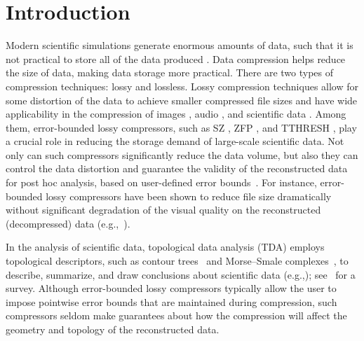 \section{Introduction}
\label{sec:introduction}

Modern scientific simulations generate enormous amounts of data, such that it is not practical to store all of the data produced \cite{cappello2019use}.
Data compression helps reduce the size of data, making data storage more practical.
There are two types of compression techniques: lossy and lossless.
Lossy compression techniques allow for some distortion of the data to achieve smaller compressed file sizes and have wide applicability in the compression of images \cite{hussain2018image}, audio \cite{kavitha2016survey}, and scientific data \cite{cappello2019use}. 
Among them, error-bounded lossy compressors, such as SZ \cite{liang2022sz3}, ZFP \cite{lindstrom2014fixed}, and TTHRESH \cite{ballester2019tthresh}, play a crucial role in reducing the storage demand of large-scale scientific data. 
Not only can such compressors significantly reduce the data volume, but also they can control the data distortion and guarantee the validity of the reconstructed data for post hoc analysis, based on user-defined error bounds~\cite{LiuDiZhao2022}. 
For instance, error-bounded lossy compressors have been shown to reduce file size dramatically without significant degradation of the visual quality on the reconstructed (decompressed) data (e.g.,~\cite{LiangDiTao2019, ballester2019tthresh,zhao2021optimizing}). 

In the analysis of scientific data, topological data analysis (TDA) employs topological descriptors, such as contour trees~\cite{carr2003computing} and Morse--Smale complexes~\cite{edelsbrunner2001hierarchical}, to describe, summarize, and draw conclusions about scientific data (e.g.,\cite{aydogan2014characterization, cazals2003molecular,rosen2021using}); see~\cite{YanMasoodSridharamurthy2021} for a survey. 
Although error-bounded lossy compressors typically allow the user to impose pointwise error bounds that are maintained during compression, such compressors seldom make guarantees about how the compression will affect the geometry and topology of the reconstructed data. 

